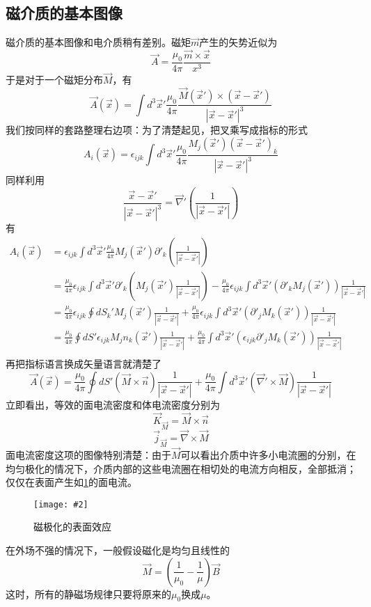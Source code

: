 \documentclass[a4paper,11pt]{ctexart}
\newcommand{\cpic}[2]{
\begin{center}
\texttt{[image: \#2]}
\end{center}
}
\newcommand{\cpicn}[3]
{
\begin{figure}[H]
\cpic{#1}{#2}
\caption{#3\label{#2}}
\end{figure}
}
\newcommand{\beq}{\begin{equation}}
\newcommand{\eeq}{\end{equation}}
\newcommand{\bea}{\begin{equation}\begin{aligned}}
\newcommand{\eea}{\end{aligned}\end{equation}}
\newcommand{\del}{\vec{\nabla}}
\begin{document}
\subsection{磁介质的基本图像}
磁介质的基本图像和电介质稍有差别。磁矩$\vec m$产生的矢势近似为
\beq
\vec A = \frac{\mu_0}{4\pi} \frac{\vec m \times \vec x}{x^3}
\eeq
于是对于一个磁矩分布$\vec M$，有
\beq
\vec A (\vec x) = \int d^3 \vec{x}' \frac{\mu_0}{4\pi} \frac{\vec M(\vec{x}') \times ( \vec x - \vec{x}')}{|\vec x - \vec{x}'|^3}
\eeq
我们按同样的套路整理右边项：为了清楚起见，把叉乘写成指标的形式
\beq
A_i (\vec x) =\epsilon_{ijk}  \int d^3 \vec{x}' \frac{\mu_0}{4\pi} \frac{M_j (\vec{x}') ( \vec x - \vec{x}')_k}{|\vec x - \vec{x}'|^3}
\eeq
同样利用
\beq
\frac{\vec x  - \vec{x}'}{|\vec x - \vec{x}'|^3} = \del' \left( \frac{1}{|\vec x - \vec{x}'|}\right)
\eeq
有
\bea
A_i (\vec x) &=\epsilon_{ijk}  \int d^3 \vec{x}' \frac{\mu_0}{4\pi} M_j (\vec{x}') \partial'_k\left( \frac{1}{|\vec x - \vec{x}'|}\right) \\
&= \frac{\mu_0}{4\pi}  \epsilon_{ijk}  \int d^3 \vec{x}'  \partial'_k \left(M_j (\vec{x}')\frac{1}{|\vec x - \vec{x}'|}\right)- \frac{\mu_0}{4\pi}  \epsilon_{ijk}  \int d^3 \vec{x}' \left( \partial'_k M_j (\vec{x}')\right)\frac{1}{|\vec x - \vec{x}'|}\\
&=  \frac{\mu_0}{4\pi}  \epsilon_{ijk}  \oint dS_k'  M_j (\vec{x}')\frac{1}{|\vec x - \vec{x}'|}+ \frac{\mu_0}{4\pi}  \epsilon_{ijk}  \int d^3 \vec{x}' \left( \partial'_j M_k (\vec{x}')\right)\frac{1}{|\vec x - \vec{x}'|}\\
&=  \frac{\mu_0}{4\pi} \oint dS'  \epsilon_{ijk}  M_j n_k (\vec{x}')\frac{1}{|\vec x - \vec{x}'|}+ \frac{\mu_0}{4\pi}  \int d^3 \vec{x}' \left( \epsilon_{ijk}  \partial'_j M_k (\vec{x}')\right)\frac{1}{|\vec x - \vec{x}'|}\\
 \eea
 再把指标语言换成矢量语言就清楚了
 \beq
 \vec A (\vec x) = \frac{\mu_0}{4\pi} \oint dS' ( \vec M \times \vec n )\frac{1}{|\vec x - \vec{x}'|} + \frac{\mu_0}{4\pi} \int d^3 \vec{x}' (\del' \times \vec M) \frac{1}{|\vec x - \vec{x}'|}
 \eeq
 立即看出，等效的面电流密度和体电流密度分别为
 \beq
 \vec K_{\vec M} = \vec M \times \vec n
 \eeq
 \beq
 \vec{j}_{\vec M} = \del \times \vec M
 \eeq
 面电流密度这项的图像特别清楚：由于$\vec M$可以看出介质中许多小电流圈的分别，在均匀极化的情况下，介质内部的这些电流圈在相切处的电流方向相反，全部抵消；仅仅在表面产生如\cref{mag_pol}的面电流。
 \cpicn{0.2}{mag_pol}{磁极化的表面效应}
 \par
 在外场不强的情况下，一般假设磁化是均匀且线性的
 \beq
 \vec M = \left( \frac{1}{\mu_0} - \frac{1}{\mu} \right) \vec B
 \eeq
 这时，所有的静磁场规律只要将原来的$\mu_0$换成$\mu$。
\end{document}
